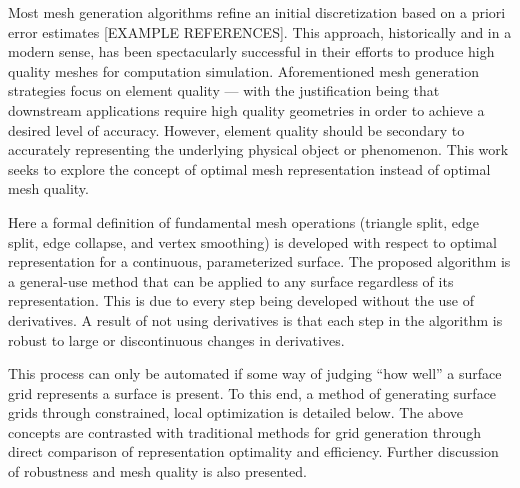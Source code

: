 Most mesh generation algorithms refine an initial discretization based on
a priori error estimates [EXAMPLE REFERENCES]. This approach,
historically and in a modern sense, has been spectacularly successful in
their efforts to produce high quality meshes for computation simulation.
Aforementioned mesh generation strategies focus on element quality ---
with the justification being that downstream applications require high
quality geometries in order to achieve a desired level of accuracy.
However, element quality should be secondary to accurately representing
the underlying physical object or phenomenon.  This work seeks to
explore the concept of optimal mesh representation instead of optimal
mesh quality.

Here a formal definition of fundamental mesh operations (triangle split,
edge split, edge collapse, and vertex smoothing) is developed with
respect to optimal representation for a continuous, parameterized
surface. The proposed algorithm is a general-use method that can be
applied to any surface regardless of its representation. This is due to
every step being developed without the use of derivatives. A result of
not using derivatives is that each step in the algorithm is robust to
large or discontinuous changes in derivatives.

This process can only be automated if some way of judging ``how well'' a
surface grid represents a surface is present. To this end, a method of
generating surface grids through constrained, local optimization is
detailed below. The above concepts are contrasted with traditional
methods for grid generation through direct comparison of representation
optimality and efficiency. Further discussion of robustness and mesh
quality is also presented.
